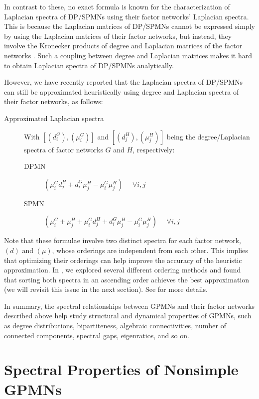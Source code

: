 \documentclass{article}
\begin{document}
In contrast to these, no exact formula is known for the
characterization of Laplacian spectra of DP/SPMNs using their factor
networks' Laplacian spectra. This is because the Laplacian matrices of
DP/SPMNs cannot be expressed simply by using the Laplacian matrices of
their factor networks, but instead, they involve the Kronecker
products of degree and Laplacian matrices of the factor networks
\cite{sayama2016estimation}. Such a coupling between degree and
Laplacian matrices makes it hard to obtain Laplacian spectra of
DP/SPMNs analytically.

However, we have recently reported \cite{sayama2016estimation} that
the Laplacian spectra of DP/SPMNs can still be approximated
heuristically using degree and Laplacian spectra of their factor
networks, as follows:
\begin{description}
\item[Approximated Laplacian spectra] With $\left[\left(d^G_i\right),
  \left(\mu^G_i\right)\right]$ and $\left[\left(d^H_j\right),
  \left(\mu^H_j\right)\right]$ being the degree/Laplacian spectra of
  factor networks $G$ and $H$, respectively:
\begin{description}
\item[DPMN] $\left(\mu^G_i d^H_j + d^G_i \mu^H_j - \mu^G_i \mu^H_j \right)$ ~~$\forall i, j$
\item[SPMN] $\left(\mu^G_i + \mu^H_j + \mu^G_i d^H_j + d^G_i \mu^H_j - \mu^G_i \mu^H_j \right)$ ~~$\forall i, j$
\end{description}
\end{description}
Note that these formulae involve two distinct spectra for each factor
network, $\left( d \right)$ and $\left( \mu \right)$, whose orderings
are independent from each other. This implies that optimizing their
orderings can help improve the accuracy of the heuristic
approximation. In \cite{sayama2016estimation}, we explored several
different ordering methods and found that sorting both spectra in
an ascending order achieves the best approximation (we will revisit
this issue in the next section). See \cite{sayama2016estimation} for
more details.

In summary, the spectral relationships between GPMNs and their factor
networks described above help study structural and dynamical
properties of GPMNs, such as degree distributions, bipartiteness,
algebraic connectivities, number of connected components, spectral
gaps, eigenratios, and so on.

\section{Spectral Properties of Nonsimple GPMNs}
\label{sec:nonsimple}
\end{document}
